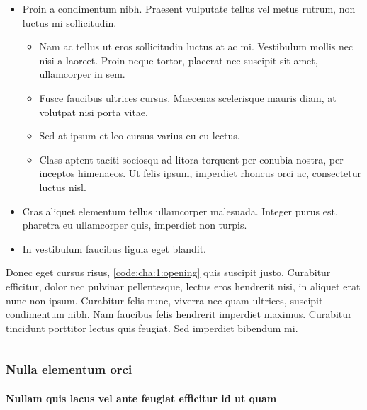 \begin{itemize}
    \item Proin a condimentum nibh. Praesent vulputate tellus vel metus rutrum, non luctus mi sollicitudin. 
    \begin{itemize}
        \item Nam ac tellus ut eros sollicitudin luctus at ac mi. Vestibulum mollis nec nisi a laoreet. Proin neque tortor, placerat nec suscipit sit amet, ullamcorper in sem.
        \item Fusce faucibus ultrices cursus. Maecenas scelerisque mauris diam, at volutpat nisi porta vitae. 
        \item Sed at ipsum et leo cursus varius eu eu lectus. 
        \item Class aptent taciti sociosqu ad litora torquent per conubia nostra, per inceptos himenaeos. Ut felis ipsum, imperdiet rhoncus orci ac, consectetur luctus nisl. 
    \end{itemize}
    \item Cras aliquet elementum tellus ullamcorper malesuada. Integer purus est, pharetra eu ullamcorper quis, imperdiet non turpis.
    \item In vestibulum faucibus ligula eget blandit. 
\end{itemize}



Donec eget cursus risus, \autoref{code:cha:1:opening} quis suscipit justo. Curabitur efficitur, dolor nec pulvinar pellentesque, lectus eros hendrerit nisi, in aliquet erat nunc non ipsum. Curabitur felis nunc, viverra nec quam ultrices, suscipit condimentum nibh. Nam faucibus felis hendrerit imperdiet maximus. Curabitur tincidunt porttitor lectus quis feugiat. Sed imperdiet bibendum mi.


\begin{code}
    \label{code:cha:1:opening}
    \inputminted[]{tex}{main.tex}
\end{code}


\subsubsection{Nulla elementum orci}

\paragraph{Nullam quis lacus vel ante feugiat efficitur id ut quam}

